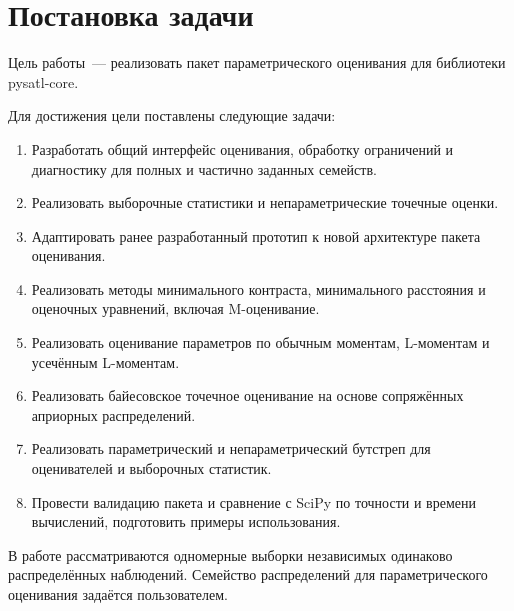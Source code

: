 
\section{Постановка задачи}
\label{sec:task}

Цель работы~--- реализовать пакет параметрического оценивания для библиотеки pysatl-core.

Для достижения цели поставлены следующие задачи:

\begin{enumerate}[itemsep=0.5em]
    \item Разработать общий интерфейс оценивания, обработку ограничений и диагностику для полных и частично заданных семейств.
    \item Реализовать выборочные статистики и непараметрические точечные оценки.
    \item Адаптировать ранее разработанный прототип к новой архитектуре пакета оценивания.
    \item Реализовать методы минимального контраста, минимального расстояния и оценочных уравнений, включая M-оценивание.
    \item Реализовать оценивание параметров по обычным моментам, \mbox{L-моментам} и усечённым \mbox{L-моментам}.
    \item Реализовать байесовское точечное оценивание на основе сопряжённых априорных распределений.
    \item Реализовать параметрический и непараметрический бутстреп для оценивателей и выборочных статистик.
    \item Провести валидацию пакета и сравнение с SciPy по точности и времени вычислений, подготовить примеры использования.
\end{enumerate}

В работе рассматриваются одномерные выборки независимых одинаково распределённых наблюдений. Семейство распределений для параметрического оценивания задаётся пользователем.
